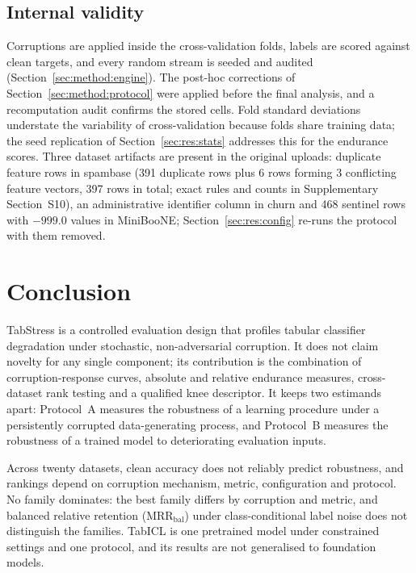 \documentclass[pdflatex,sn-mathphys]{sn-jnl}
\theoremstyle{thmstyleone}
\theoremstyle{thmstyletwo}
\theoremstyle{thmstylethree}
\newcommand{\MRR}{\mathrm{MRR}}
\begin{document}
\subsection{Internal validity}\label{sec:threats:internal}
Corruptions are applied inside the cross-validation folds, labels are scored against clean targets, and every random stream is seeded and audited (Section~\ref{sec:method:engine}). The post-hoc corrections of Section~\ref{sec:method:protocol} were applied before the final analysis, and a recomputation audit confirms the stored cells. Fold standard deviations understate the variability of cross-validation because folds share training data; the seed replication of Section~\ref{sec:res:stats} addresses this for the endurance scores. Three dataset artifacts are present in the original uploads: duplicate feature rows in spambase (391 duplicate rows plus 6 rows forming 3 conflicting feature vectors, 397 rows in total; exact rules and counts in Supplementary Section~S10), an administrative identifier column in churn and 468 sentinel rows with $-999.0$ values in MiniBooNE; Section~\ref{sec:res:config} re-runs the protocol with them removed.

\section{Conclusion}\label{sec:conclusion}

TabStress is a controlled evaluation design that profiles tabular classifier degradation under stochastic, non-adversarial corruption. It does not claim novelty for any single component; its contribution is the combination of corruption-response curves, absolute and relative endurance measures, cross-dataset rank testing and a qualified knee descriptor. It keeps two estimands apart: Protocol~A measures the robustness of a learning procedure under a persistently corrupted data-generating process, and Protocol~B measures the robustness of a trained model to deteriorating evaluation inputs.

Across twenty datasets, clean accuracy does not reliably predict robustness, and rankings depend on corruption mechanism, metric, configuration and protocol. No family dominates: the best family differs by corruption and metric, and balanced relative retention ($\MRR_{\mathrm{bal}}$) under class-conditional label noise does not distinguish the families. TabICL is one pretrained model under constrained settings and one protocol, and its results are not generalised to foundation models.
\end{document}
